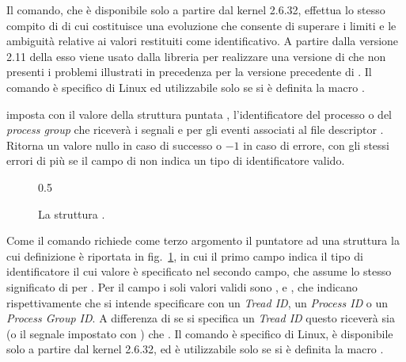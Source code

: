 \begin{basedescript}{\desclabelwidth{1.8cm}}
  Il comando, che è disponibile solo a partire dal kernel 2.6.32, effettua lo
  stesso compito di  di cui costituisce una evoluzione che
  consente di superare i limiti e le ambiguità relative ai valori restituiti
  come identificativo. A partire dalla versione 2.11 della  esso
  viene usato dalla libreria per realizzare una versione di  che
  non presenti i problemi illustrati in precedenza per la versione precedente
  di .  Il comando è specifico di Linux ed utilizzabile solo
  se si è definita la macro .

\item[\constd{F\_SETOWN\_EX}] imposta con il valore della struttura
   puntata , l'identificatore del processo o
  del \textit{process group} che riceverà i segnali  e
   per gli eventi associati al file
  descriptor . Ritorna un valore nullo in caso di successo o $-1$ in
  caso di errore, con gli stessi errori di  più
   se il campo  di  non indica
  un tipo di identificatore valido.

  \begin{figure}[!htb]
    \footnotesize \centering
    \begin{varwidth}[c]{0.5\textwidth}
    \end{varwidth}
    \normalsize 
    \caption{La struttura .} 
    \label{fig:f_owner_ex}
  \end{figure}

  Come  il comando richiede come terzo argomento il
  puntatore ad una struttura  la cui definizione è
  riportata in fig.~\ref{fig:f_owner_ex}, in cui il primo campo indica il tipo
  di identificatore il cui valore è specificato nel secondo campo, che assume
  lo stesso significato di  per . Per il campo
   i soli valori validi sono ,
   e , che indicano
  rispettivamente che si intende specificare con  un \textit{Tread
    ID}, un \textit{Process ID} o un \textit{Process Group ID}. A differenza
  di  se si specifica un \textit{Tread ID} questo riceverà
  sia  (o il segnale impostato con ) che
  . Il comando è specifico di Linux, è disponibile solo a
  partire dal kernel 2.6.32, ed è utilizzabile solo se si è definita la macro
  .


\end{basedescript}
